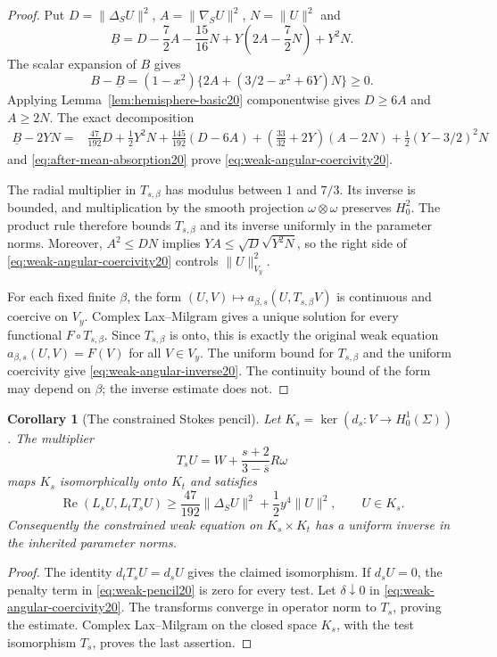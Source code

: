 \documentclass[11pt,a4paper]{article}
\newtheorem{corollary}[theorem]{Corollary}
\theoremstyle{remark}
\numberwithin{equation}{section}
\begin{document}
\begin{proof}
Put $D=\|\Delta_SU\|^2$, $A=\|\nabla_SU\|^2$, $N=\|U\|^2$ and
\[
 \underline B=D-\frac72A-\frac{15}{16}N
   +Y\left(2A-\frac72N\right)+Y^2N.
\]
The scalar expansion of $B$ gives
\[
 B-\underline B=(1-x^2)\{2A+(3/2-x^2+6Y)N\}\ge0.
\]
Applying Lemma~\ref{lem:hemisphere-basic20} componentwise gives
$D\ge6A$ and $A\ge2N$. The exact decomposition
\begin{align*}
 \underline B-2YN={}&\frac{47}{192}D+\frac12Y^2N
 +\frac{145}{192}(D-6A)
 +\left(\frac{33}{32}+2Y\right)(A-2N)
 +\frac12(Y-3/2)^2N
\end{align*}
and \eqref{eq:after-mean-absorption20} prove
\eqref{eq:weak-angular-coercivity20}.

The radial multiplier in $T_{s,\beta}$ has modulus between $1$ and
$7/3$. Its inverse is bounded, and multiplication by the smooth projection
$\omega\otimes\omega$ preserves $H_0^2$. The product rule therefore bounds
$T_{s,\beta}$ and its inverse uniformly in the parameter norms. Moreover,
$A^2\le DN$ implies $YA\le\sqrt D\sqrt{Y^2N}$, so the right side of
\eqref{eq:weak-angular-coercivity20} controls $\|U\|_{V_y}^2$.

For each fixed finite $\beta$, the form
$(U,V)\mapsto a_{\beta,s}(U,T_{s,\beta}V)$ is continuous and coercive on
$V_y$. Complex Lax--Milgram gives a unique solution for every functional
$F\circ T_{s,\beta}$. Since $T_{s,\beta}$ is onto, this is exactly the
original weak equation $a_{\beta,s}(U,V)=F(V)$ for all $V\in V_y$.
The uniform bound for $T_{s,\beta}$ and the uniform coercivity give
\eqref{eq:weak-angular-inverse20}. The continuity bound of the form may
depend on $\beta$; the inverse estimate does not.
\end{proof}

\begin{corollary}[The constrained Stokes pencil]\label{cor:stokes-kernel20}
Let $K_s=\ker(d_s:V\to H_0^1(\Sigma))$. The multiplier
\[
 T_sU=W+\frac{s+2}{3-\overline s}R\omega
\]
maps $K_s$ isomorphically onto $K_t$ and satisfies
\[
 \operatorname{Re}(L_sU,L_tT_sU)
 \ge\frac{47}{192}\|\Delta_SU\|^2+\frac12y^4\|U\|^2,
 \qquad U\in K_s.
\]
Consequently the constrained weak equation on $K_s\times K_t$ has a
uniform inverse in the inherited parameter norms.
\end{corollary}

\begin{proof}
The identity $d_tT_sU=d_sU$ gives the claimed isomorphism. If $d_sU=0$,
the penalty term in \eqref{eq:weak-pencil20} is zero for every test.
Let $\delta\downarrow0$ in \eqref{eq:weak-angular-coercivity20}.
The transforms converge in operator norm to $T_s$, proving the estimate.
Complex Lax--Milgram on the closed space $K_s$, with the test isomorphism
$T_s$, proves the last assertion.
\end{proof}
\end{document}
